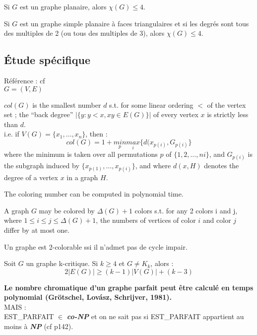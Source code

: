 \begin{theorem}
Si $G$ est un graphe planaire, alors $\chi(G)\leq 4$.
\end{theorem}

\begin{theorem}
Si $G$ est un graphe simple planaire à faces triangulaires et si les degrés sont tous des multiples de 2
(ou tous des multiples de 3), alors $\chi(G)\leq 4$.
\end{theorem}

\subsection{Étude spécifique}
Référence : cf \cite{jensen1996graph}\\
$G=(V,E)$

\begin{defin}
$col(G)$ is the smallest number $d$ s.t. for some linear ordering $<$ of
the vertex set ; the ``back degree'' $|\{y:y<x,xy\in E(G)\}|$ of every
vertex $x$ is strictly less than $d$.\\
i.e. if $V(G)=\{x_1,\dots,x_n\}$, then :
$$col(G)=1+\underset{p}{min}\underset{i}{max}\{d(x_{p(i)},G_{p(i)}\}$$
where the minimum is taken over all permutations $p$ of $\{1,2,\dots,ni\}$,
and $G_{p(i)}$ is the subgraph induced by $\{x_{p(1)},\dots,x_{p(i)}\}$,
and where $d(x,H)$ denotes the degree of a vertex $x$ in a graph $H$.
\end{defin}

The coloring number can be computed in polynomial time.

\begin{theorem}
A graph $G$ may be colored by $\Delta(G)+1$ colors s.t. for any 2 colors i and j, where
$1 \leq i \leq j \leq \Delta (G) + 1$, the numbers of vertices of color $i$ and color $j$
differ by at most one.
\end{theorem}

\begin{theorem}[König, {[1916,1936]}]
Un graphe est 2-colorable ssi il n'admet pas de cycle impair.
\end{theorem}

\begin{theorem}[Dirac, {[1957]}]
Soit $G$ un graphe k-critique. Si $k \geq 4$ et $G \neq K_k$, alors :
$$2|E(G)| \geq (k-1)|V(G)|+(k-3)$$
\end{theorem}

\textbf{Le nombre chromatique d'un graphe parfait peut être calculé en temps polynomial
(Grötschel, Lov\'{a}sz, Schrijver, 1981).}\\
MAIS :\\
EST\_PARFAIT $\in$ \textit{\textbf{co-NP}} et on ne sait pas si EST\_PARFAIT appartient au moins à \textit{\textbf{NP}}
(cf \cite{jensen1996graph} p142).

